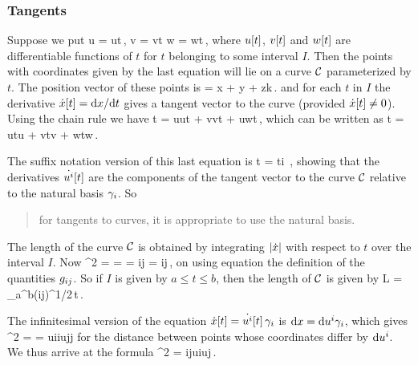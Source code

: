 \subsubsection{Tangents}
Suppose we put
\beq
u = u\vat t\,,\qquad
v = v\vat t\qquad{}\qquad
w = w\vat t\,,
\eeq
where $u\!\left[{t}\right]$, $v\!\left[{t}\right]$ and $w\!\left[{t}\right]$ are differentiable functions of $t$ for $t$ belonging to some interval $I$. Then the points with coordinates given by the last equation will lie on a curve $\mathcal{C}$ parameterized by $t$. The position vector of these points is
\beq
\pvec = x\nvec\imath 
        + y\nvec\jmath
        + z\nvec k\,.
\eeq
and for each $t$ in $I$ the derivative $\dot{x}\!\left[{t}\right] = \text{d}x/\text{d} t$ gives a tangent vector to the
curve (provided $\dot{x}\!\left[{t}\right] \neq 0$). Using the chain rule we have
\beq
\xod\pvec t =   \xpd\pvec u\xod ut 
              + \xpd\pvec v\xod vt
              + \xpd\pvec u\xod wt\,,
\eeq
which can be written as
\beq
\dt\pvec\vat t = \dt u\vat t\ifvec u + \dt v\vat t\ifvec v + \dt w\vat t\ifvec w\,.
\eeq

The suffix notation version of this last equation is
\beq
\dt\pvec\vat t = \vat t\ifvec i \,,
\eeq
showing that the derivatives $\dot{{u}^{i}}\!\left[{t}\right]$ are the components of the tangent vector to the curve $\mathcal{C}$ relative to the natural basis $\gamma_{i}$. So 
\begin{quote}
for tangents to curves, it is appropriate to use the natural basis.
\end{quote}

The length of the curve $\mathcal{C}$ is obtained by integrating $\lvert{\dot{x}}\rvert$ with respect to $t$ over the interval $I$. Now
\beq
\magn{\dt\pvec}^2 = \dt\pvec\dt\pvec 
                  = \dt\pvec\iprod\dt\pvec 
                  = \ifvec i\iprod{}\ifvec j
                  = \imet ij\,,
\eeq
on using equation the definition of the quantities $g_{{i}{j}}$. So if $I$ is given by $a\leq t\leq b$, then the length of $\mathcal{C}$ is given by
\beq
L = \int_a^b\left(\imet ij\right)^{1/2}\,\dx t\,.
\eeq

The infinitesimal version of the equation $\dot{x}\!\left[{t}\right] = \dot{{u}^{i}}\!\left[{t}\right]\gamma_{i}$ is $\text{d}x = \text{d}{u}^{i}\gamma_{i}$, which gives
\beq
\dx\svec^2 = \dx\pvec\dx\pvec = \dx\comp ui\ifvec i\iprod\dx\comp uj\ifvec j
\eeq
for the distance between points whose coordinates differ by $\text{d}{u}^{i}$. We thus arrive at the formula
\beq
\dx\svec^2 = \imet ij\dx\comp ui\dx\comp uj\,.
\eeq


